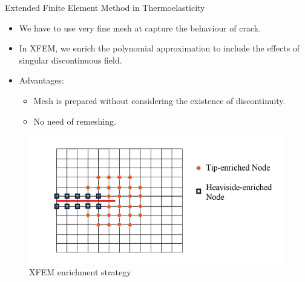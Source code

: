 \documentclass{beamer}
\begin{document}
\begin{frame}[t,fragile]{Extended Finite Element Method in Thermoelasticity}
    \begin{itemize}
        \item We have to use very fine mesh at capture the behaviour of crack.
\item In XFEM, we enrich the polynomial approximation to include the effects of singular discontinuous field.
    \item Advantages:
    \begin{itemize}
        \item Mesh is prepared without considering the existence of discontinuity.
        \item No need of remeshing.
    \end{itemize}
\end{itemize}
\begin{figure}
     \centering
     \vspace{-10pt}
     \includegraphics[scale=.3]{enrich.png}
     \caption{\hspace{-2cm}\footnotesize XFEM enrichment strategy}
  \end{figure}
\end{frame}
\end{document}
